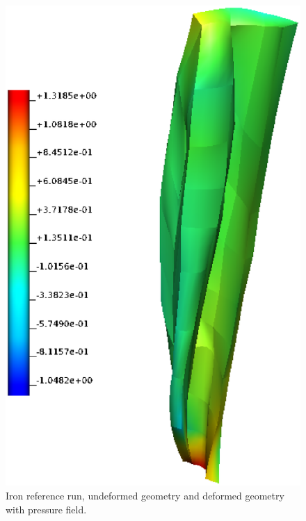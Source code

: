 \begin{figure}[h!]
    \includegraphics[width=0.49\columnwidth]{examples/example-0204-u/doc/figures/deformed_geometry-pressure.eps}
    \caption{Iron reference run, undeformed geometry and deformed geometry with pressure field.}
    \label{example-0204-u-iron-reference-undeformed-geometry-deformed-geometry-pressure-fig}
\end{figure}
%
